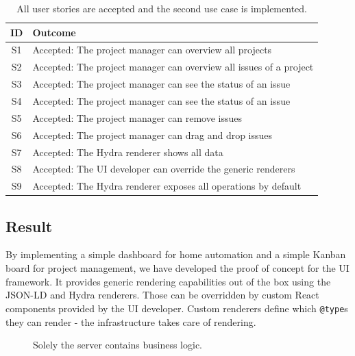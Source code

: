 \begin{table}[!htb]
  \begin{center}
    \begin{tabular}{ |c|l| }
      \hline
      \textbf{ID} & \textbf{Outcome} \\
      \hline
      S1 & Accepted: The project manager can overview all projects \\
      \hline
      S2 & Accepted: The project manager can overview all issues of a project \\
      \hline
      S3 & Accepted: The project manager can see the status of an issue \\
      \hline
      S4 & Accepted: The project manager can see the status of an issue \\
      \hline
      S5 & Accepted: The project manager can remove issues \\
      \hline
      S6 & Accepted: The project manager can drag and drop issues \\
      \hline
      S7 & Accepted: The Hydra renderer shows all data \\
      \hline
      S8 & Accepted: The UI developer can override the generic renderers \\
      \hline
      S9 & Accepted: The Hydra renderer exposes all operations by default \\
      \hline
    \end{tabular}
    \caption{All user stories are accepted and the second use case is implemented.}
  \end{center}
\end{table}

\subsection{Result}
By implementing a simple dashboard for home automation and a simple Kanban board for project management, we have developed the proof of concept for the UI framework. It provides generic rendering capabilities out of the box using the JSON-LD and Hydra renderers. Those can be overridden by custom React components provided by the UI developer. Custom renderers define which \lstinline{@type}s they can render - the infrastructure takes care of rendering.

\begin{figure}[!htb]
  \caption{Solely the server contains business logic.}
  \label{fig:businesslogic}
\end{figure}

